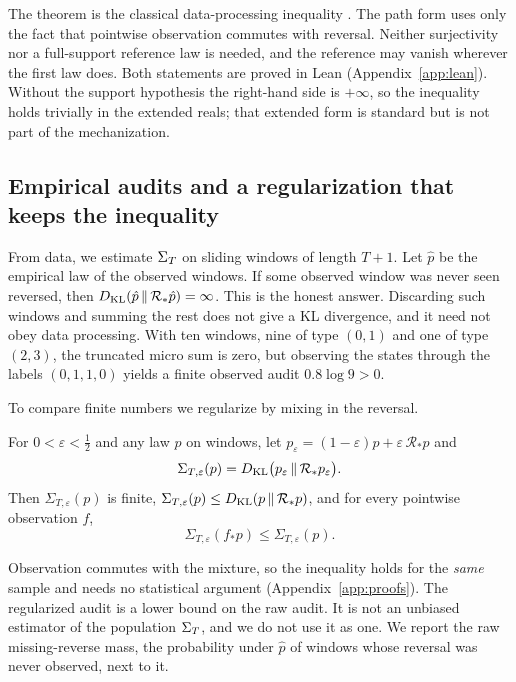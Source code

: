 The theorem is the classical data-processing inequality \cite{coverthomas2006}. The path form uses only the fact that pointwise observation commutes with reversal. Neither surjectivity nor a full-support reference law is needed, and the reference may vanish wherever the first law does. Both statements are proved in Lean (Appendix~\ref{app:lean}). Without the support hypothesis the right-hand side is \(+\infty\), so the inequality holds trivially in the extended reals; that extended form is standard but is not part of the mechanization.

\subsection{Empirical audits and a regularization that keeps the inequality}

From data, we estimate \(\Sigma_T\) on sliding windows of length \(T+1\). Let \(\hat p\) be the empirical law of the observed windows. If some observed window was never seen reversed, then \(D_{\mathrm{KL}}(\hat p\,\|\,\mathcal R_*\hat p)=\infty\). This is the honest answer. Discarding such windows and summing the rest does not give a KL divergence, and it need not obey data processing. With ten windows, nine of type \((0,1)\) and one of type \((2,3)\), the truncated micro sum is zero, but observing the states through the labels \((0,1,1,0)\) yields a finite observed audit \(0.8\log 9>0\).

To compare finite numbers we regularize by mixing in the reversal.

\begin{proposition}\label{prop:mixture}
For \(0<\varepsilon<\tfrac12\) and any law \(p\) on windows, let \(p_\varepsilon=(1-\varepsilon)p+\varepsilon\,\mathcal R_*p\) and
\[
\Sigma_{T,\varepsilon}(p)=D_{\mathrm{KL}}\big(p_\varepsilon\,\|\,\mathcal R_*p_\varepsilon\big).
\]
Then \(\Sigma_{T,\varepsilon}(p)\) is finite, \(\Sigma_{T,\varepsilon}(p)\le D_{\mathrm{KL}}(p\,\|\,\mathcal R_*p)\), and for every pointwise observation \(f\),
\[
\Sigma_{T,\varepsilon}(f_*p)\le\Sigma_{T,\varepsilon}(p).
\]
\end{proposition}

Observation commutes with the mixture, so the inequality holds for the \emph{same} sample and needs no statistical argument (Appendix~\ref{app:proofs}). The regularized audit is a lower bound on the raw audit. It is not an unbiased estimator of the population \(\Sigma_T\), and we do not use it as one. We report the raw missing-reverse mass, the probability under \(\hat p\) of windows whose reversal was never observed, next to it.

